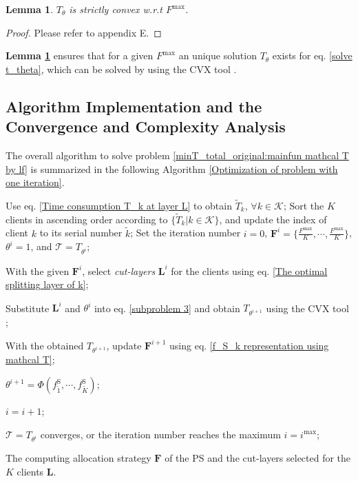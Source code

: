 \documentclass[10pt,journal,transmag]{IEEEtran}
\newtheorem{lemma}{Lemma}
\begin{document}
\begin{lemma}
    $T_\theta$ is strictly convex w.r.t $F^\text{max}$.
    \label{lemma 3}
\end{lemma}
\begin{proof}
    Please refer to appendix E.    
\end{proof}

\textbf{Lemma \ref{lemma 3}} ensures that for a given $F^\text{max}$ an unique solution $T_\theta$ exists for eq. \eqref{solve t_theta}, which can be solved by using the CVX tool \cite{grant2013cvx}.


\subsection{Algorithm Implementation and the Convergence and Complexity Analysis}
The overall algorithm to solve problem \eqref{minT_total_original:mainfun mathcal T by lf} is summarized in the following Algorithm \ref{Optimization of problem with one iteration}.

\begin{algorithm}
\caption{The overall algorithm to solve problem \eqref{minT_total_original:mainfun mathcal T by lf}. }
\label{Optimization of problem with one iteration}
\begin{small}
\begin{algorithmic}[1]
    
    \STATE Use eq. \eqref{Time consumption T_k at layer L} to obtain $\tilde{T}_k$, $\forall k \in \mathcal{K}$;
    \STATE Sort the $K$ clients in ascending order according to $\{\tilde{T}_k|k \in\mathcal{K}\}$, and update the index of client $k$ to its serial number $\tilde{k}$;
    \STATE Set the iteration number $i = 0$, $\textbf{F}^{i} = \{\frac{F^\text{max}}{K}, \cdots, \frac{F^\text{max}}{K}\}$, $\theta ^i= 1$, and $\mathcal{T}=T_{\theta^i}$;

    \REPEAT
        \STATE With the given $\textbf{F}^i$, select \textit{cut-layers} $\textbf{L}^i$ for the clients using eq. \eqref{The optimal splitting layer of k};
        
        \STATE Substitute $\textbf{L}^i$ and $\theta ^i$ into eq. \eqref{subproblem 3} and obtain $T_{\theta^{i+1}}$ using the CVX tool \cite{grant2013cvx}; 
        
        \STATE With the obtained $T_{\theta^{i+1}}$, update $\textbf{F}^{i+1}$ using eq. \eqref{f_S_k representation using mathcal T};
        
        \STATE $\theta^{i+1} = \Phi \left(f^\text{S}_{\tilde{1}},  \cdots, f^\text{S}_{\tilde{K}}\right)$;

        \STATE $i=i+1$;

    \UNTIL $\mathcal{T}=T_{\theta^i}$ converges, or the iteration number reaches the maximum $i=i^\text{max}$;

    \RETURN The computing allocation strategy $\textbf{F}$ of the PS and the cut-layers selected for the $K$ clients $\textbf{L}$.
\end{algorithmic}
\end{small}
\end{algorithm}
\end{document}
